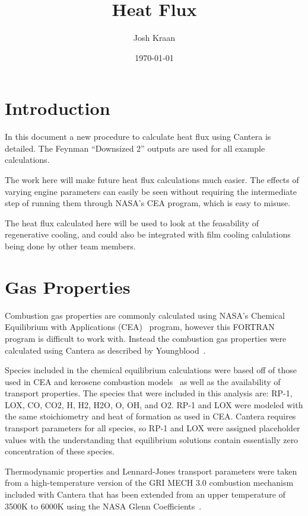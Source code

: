 \documentclass[11pt]{article}
\title{Heat Flux}
\author{Josh Kraan}
\date{\today}
\begin{document}
\maketitle

\section{Introduction}
In this document a new procedure to calculate heat flux using Cantera is detailed. The Feynman ``Downsized 2'' outputs are used for all example calculations.

The work here will make future heat flux calculations much easier. The effects of varying engine parameters can easily be seen without requiring the intermediate step of running them through NASA's CEA program, which is easy to misuse.

The heat flux calculated here will be used to look at the feasability of regenerative cooling, and could also be integrated with film cooling calulations being done by other team members.

\section{Gas Properties}

Combustion gas properties are commonly calculated using NASA's Chemical Equilibrium with Applications (CEA)~\cite{gorden_computer_1996} program, however this FORTRAN program is difficult to work with. Instead the combustion gas properties were calculated using Cantera as described by Youngblood~\cite{youngblood_design_2015}.

Species included in the chemical equilibrium calculations were based off of those used in CEA and kerosene combustion models~\cite{wang_thermophysics_2001} as well as the availability of transport properties. The species that were included in this analysis are: RP-1, LOX, CO, CO2, H, H2, H2O, O, OH, and O2. RP-1 and LOX were modeled with the same stoichiometry and heat of formation as used in CEA. Cantera requires transport parameters for all species, so RP-1 and LOX were assigned placeholder values with the understanding that equilibrium solutions contain essentially zero concentration of these species.

Thermodynamic properties and Lennard-Jones transport parameters were taken from a high-temperature version of the GRI MECH 3.0 combustion mechanism~\cite{smith_gri-mech_????} included with Cantera that has been extended from an upper temperature of 3500K to 6000K using the NASA Glenn Coefficients~\cite{mcbride_nasa_2002}.
\end{document}
